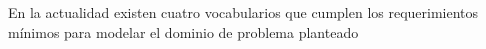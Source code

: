 En la actualidad existen cuatro vocabularios que cumplen los requerimientos mínimos para modelar el dominio de problema planteado\\
\\

\\

\\

\\
